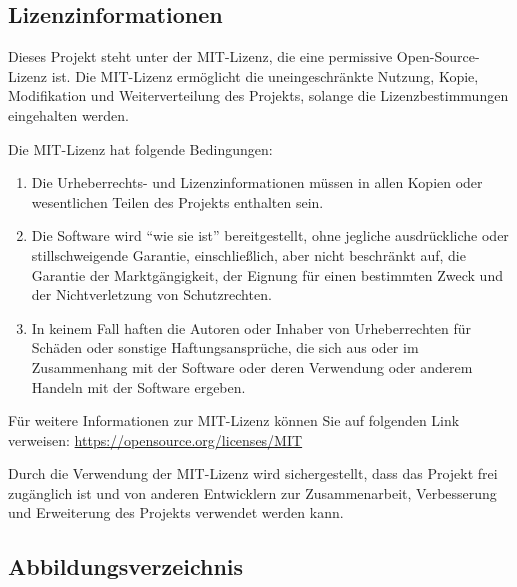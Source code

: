 \documentclass[a4paper]{article}
\begin{document}
\clearpage

\subsection{Lizenzinformationen}
Dieses Projekt steht unter der MIT-Lizenz, die eine permissive Open-Source-Lizenz ist. Die MIT-Lizenz ermöglicht die uneingeschränkte Nutzung, Kopie, Modifikation und Weiterverteilung des Projekts, solange die Lizenzbestimmungen eingehalten werden.

Die MIT-Lizenz hat folgende Bedingungen:

\begin{enumerate}
	\item Die Urheberrechts- und Lizenzinformationen müssen in allen Kopien oder wesentlichen Teilen des Projekts enthalten sein.
	\item Die Software wird ``wie sie ist'' bereitgestellt, ohne jegliche ausdrückliche oder stillschweigende Garantie, einschließlich, aber nicht beschränkt auf, die Garantie der Marktgängigkeit, der Eignung für einen bestimmten Zweck und der Nichtverletzung von Schutzrechten.
	\item In keinem Fall haften die Autoren oder Inhaber von Urheberrechten für Schäden oder sonstige Haftungsansprüche, die sich aus oder im Zusammenhang mit der Software oder deren Verwendung oder anderem Handeln mit der Software ergeben.
\end{enumerate}

Für weitere Informationen zur MIT-Lizenz können Sie auf folgenden Link verweisen: \url{https://opensource.org/licenses/MIT}

Durch die Verwendung der MIT-Lizenz wird sichergestellt, dass das Projekt frei zugänglich ist und von anderen Entwicklern zur Zusammenarbeit, Verbesserung und Erweiterung des Projekts verwendet werden kann.

\subsection{Abbildungsverzeichnis}
\listoffigures
\end{document}

